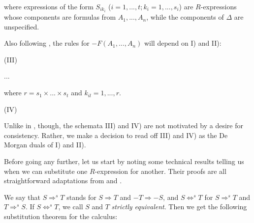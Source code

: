 \documentclass{article}%
\theoremstyle{break}
\begin{document}
\vspace{0.2cm}



\noindent where expressions of the form $S_{i k_{i}}$ ($i=1,...,t; k_{i}=1,...,s_{i}$) are $R$-expressions whose components are formulas from $A_1,...,A_n$, while the components of $\Delta$ are unspecified.



\noindent Also following \cite[p. 108]{Kutschera1969}, the rules for $-F(A_1,..., A_n)$ will depend on I) and II): 

\vspace{0.2cm}
(III)
\begin{center}
    \quad{}\quad ... \quad {}
\end{center}
\vspace{0.2cm}


\noindent where $r=s_1\times ...\times s_t$ and $k_{i l}=1, ..., r$.

\vspace{0.2cm}
(IV)
\begin{center}
\quad{}
\end{center}
\vspace{0.2cm}


Unlike in \cite{Kutschera1969}, though, the schemata  III) and IV) are not motivated by a desire for consistency. Rather, we make a decision to read off III) and IV) as the De Morgan duals of I) and II).

Before going any further, let us start by noting some technical results telling us when we can substitute one $R$-expression for another. Their proofs are all straightforward adaptations from \cite{Kutschera1968} and \cite{Kutschera1969}. 

\noindent We say that $S \Rightarrow^{s} T$ stands for $S \Rightarrow T$ and $-T \Rightarrow -S$, and $S \Leftrightarrow^{s} T$ for $S \Rightarrow^{s} T$ and $T \Rightarrow^{s} S$. 
If $S \Leftrightarrow^{s} T$, we call $S$ and $T$ \emph{strictly equivalent}.
Then we get the following substitution theorem for the calculus:
\end{document}
